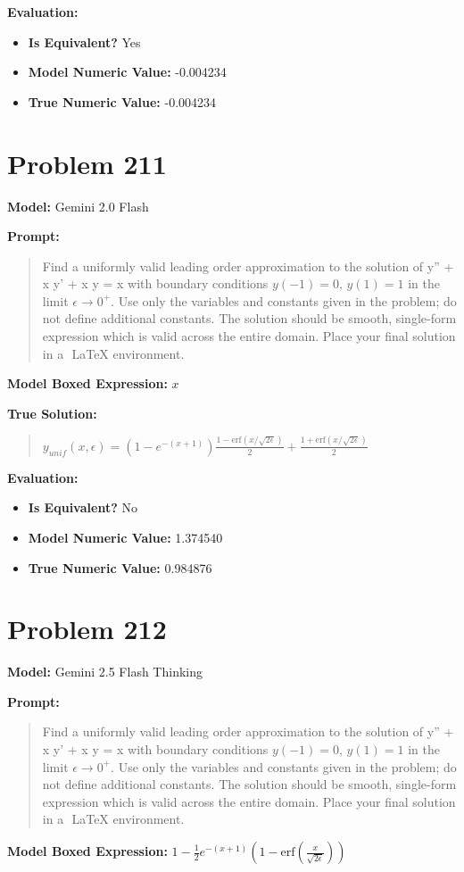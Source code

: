 \documentclass{article}
\begin{document}
{\textbf{Evaluation:}
\begin{itemize}
\item \textbf{Is Equivalent?} Yes
\item \textbf{Model Numeric Value:} -0.004234
\item \textbf{True Numeric Value:} -0.004234
\end{itemize}
\vspace{1cm}
\section*{Problem 211}
\textbf{Model:} Gemini 2.0 Flash

\textbf{Prompt:}
\begin{quote}
Find a uniformly valid leading order approximation to the solution of \epsilon y'' + x y' + x y = x with boundary conditions $y(-1) = 0$, $y(1) = 1$ in the limit $\epsilon \to 0^+$. Use only the variables and constants given in the problem; do not define additional constants. The solution should be smooth, single-form expression which is valid across the entire domain. Place your final solution in a $\boxed{}$ LaTeX environment.
\end{quote}
\textbf{Model Boxed Expression:} $x$

\textbf{True Solution:}
\begin{quote}
$y_{unif}(x, \epsilon) = \left(1 - e^{-(x+1)}\right) \frac{1-\text{erf}(x/\sqrt{2\epsilon})}{2} + \frac{1+\text{erf}(x/\sqrt{2\epsilon})}{2}$
\end{quote}

\textbf{Evaluation:}
\begin{itemize}
\item \textbf{Is Equivalent?} No
\item \textbf{Model Numeric Value:} 1.374540
\item \textbf{True Numeric Value:} 0.984876
\end{itemize}
\vspace{1cm}
\section*{Problem 212}
\textbf{Model:} Gemini 2.5 Flash Thinking

\textbf{Prompt:}
\begin{quote}
Find a uniformly valid leading order approximation to the solution of \epsilon y'' + x y' + x y = x with boundary conditions $y(-1) = 0$, $y(1) = 1$ in the limit $\epsilon \to 0^+$. Use only the variables and constants given in the problem; do not define additional constants. The solution should be smooth, single-form expression which is valid across the entire domain. Place your final solution in a $\boxed{}$ LaTeX environment.
\end{quote}
\textbf{Model Boxed Expression:} $1 - \frac{1}{2}e^{-(x+1)}\left(1-\text{erf}\left(\frac{x}{\sqrt{2\epsilon}}\right)\right)$

}
\end{document}
